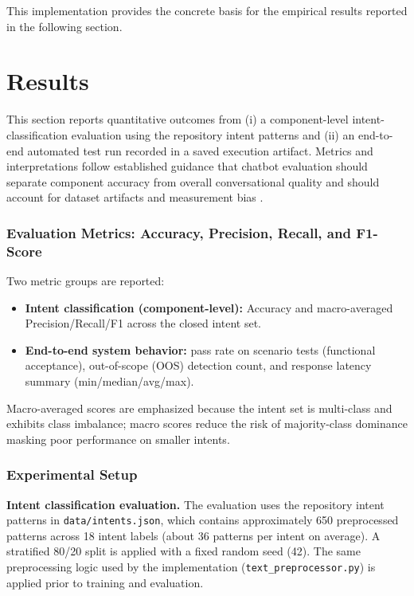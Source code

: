 \documentclass[12pt,onecolumn]{report}
\begin{document}
This implementation provides the concrete basis for the empirical results reported in the following section.

\chapter{Results}
This section reports quantitative outcomes from (i) a component-level intent-classification evaluation using the repository intent patterns and (ii) an end-to-end automated test run recorded in a saved execution artifact. Metrics and interpretations follow established guidance that chatbot evaluation should separate component accuracy from overall conversational quality and should account for dataset artifacts and measurement bias \cite{maroengsit2019evaluation,gururangan2018annotation,geva2019shortcut,swayamdipta2020dataset}.

\subsection{Evaluation Metrics: Accuracy, Precision, Recall, and F1-Score}
Two metric groups are reported:
\begin{itemize}
	\item \textbf{Intent classification (component-level):} Accuracy and macro-averaged Precision/Recall/F1 across the closed intent set.
	\item \textbf{End-to-end system behavior:} pass rate on scenario tests (functional acceptance), out-of-scope (OOS) detection count, and response latency summary (min/median/avg/max).
\end{itemize}
Macro-averaged scores are emphasized because the intent set is multi-class and exhibits class imbalance; macro scores reduce the risk of majority-class dominance masking poor performance on smaller intents.

\subsection{Experimental Setup}
\textbf{Intent classification evaluation.} The evaluation uses the repository intent patterns in \texttt{data/intents.json}, which contains approximately 650 preprocessed patterns across 18 intent labels (about 36 patterns per intent on average). A stratified 80/20 split is applied with a fixed random seed (42). The same preprocessing logic used by the implementation (\texttt{text\_preprocessor.py}) is applied prior to training and evaluation.
\end{document}
